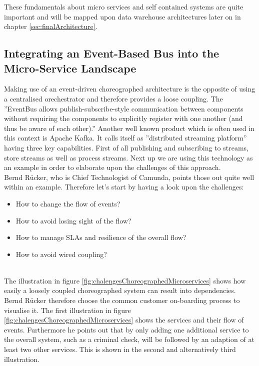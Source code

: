 These fundamentals about micro services and self contained systems are quite important and will be mapped upon data warehouse architectures later on in chapter \ref{sec:finalArchitecture}.

\subsection{Integrating an Event-Based Bus into the Micro-Service Landscape}
Making use of an event-driven choreographed architecture is the opposite of using a centralised orechestrator and therefore provides a loose coupling. The ''EventBus allows publish-subscribe-style communication between components without requiring the components to explicitly register with one another (and thus be aware of each other).'' \cite{EventBusExplained} \newline
Another well known product which is often used in this context is Apache Kafka. It calls itself as ''distributed streaming platform'' having three key capabilities. First of all publishing and subscribing to streams, store streams as well as process streams.\cite{kafka}
Next up we are using this technology as an example in order to elaborate upon the challenges of this approach.\newline
\\
Bernd Rücker, who is Chief Technologist of Camunda, points those out quite well within an example. Therefore let's start by having a look upon the challenges:
\begin{itemize}
    \item How to change the flow of events?
    \item How to avoid losing sight of the flow?
    \item How to manage SLAs and resilience of the overall flow?
    \item How to avoid wired coupling?
\end{itemize}
\cite{eventDrivenMicroservices}\newline
\\
The illustration in figure \ref{fig:chalengesChoreographedMicroservices} shows how easily a loosely coupled choreographed system can result into dependencies. Bernd Rücker therefore choose the common customer on-boarding process to visualise it. The first illustration in figure \ref{fig:chalengesChoreographedMicroservices} shows the services and their flow of events. Furthermore he points out that by only adding one additional service to the overall system, such as a criminal check, will be followed by an adaption of at least two other services. This is shown in the second and alternatively third illustration.\cite{eventDrivenMicroservices}\newline
